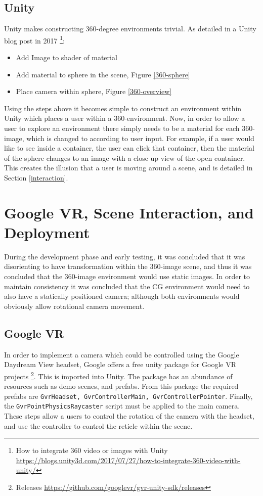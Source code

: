 \documentclass[ %
                    author={Elis Jones},
                supervisor={Dr. Kirsten Cater},
                    degree={BSc},
                     title={The Effect of Presentation Medium on Spatial Cognition},
                  subtitle={in the Virtual Environment},
                      year={2018} ]{dissertation}
\begin{document}
\subsection{Unity}
Unity makes constructing 360-degree environments trivial. As detailed in a Unity blog post in 2017 \footnote{How to integrate 360 video or images with Unity \url{https://blogs.unity3d.com/2017/07/27/how-to-integrate-360-video-with-unity/}}: 

\begin{itemize}
\item Add Image to shader of material
\item Add material to sphere in the scene, Figure \ref{360-sphere}
\item Place camera within sphere, Figure \ref{360-overview}
\end{itemize}

Using the steps above it becomes simple to construct an environment within Unity which places a user within a 360-environment. Now, in order to allow a user to explore an environment there simply needs to be a material for each 360-image, which is changed to according to user input. For example, if a user would like to see inside a container, the user can click that container, then the material of the sphere changes to an image with a close up view of the open container. This creates the illusion that a user is moving around a scene, and is detailed in Section \ref{interaction}. 

\section{Google VR, Scene Interaction, and Deployment}
During the development phase and early testing, it was concluded that it was disorienting to have transformation within the 360-image scene, and thus it was concluded that the 360-image environment would use static images. In order to maintain consistency it was concluded that the CG environment would need to also have a statically positioned camera; although both environments would obviously allow rotational camera movement.  

\subsection{Google VR}\label{googlevr}

In order to implement a camera which could be controlled using the Google Daydream View headset, Google offers a free unity package for Google VR projects \footnote{Releases \url{https://github.com/googlevr/gvr-unity-sdk/releases}}. This is imported into Unity. The package has an abundance of resources such as demo scenes, and prefabs. From this package the required prefabs are \lstinline{GvrHeadset, GvrControllerMain, GvrControllerPointer}. Finally, the \lstinline{GvrPointPhysicsRaycaster} script must be applied to the main camera. These steps allow a users to control the rotation of the camera with the headset, and use the controller to control the reticle within the scene. 
\end{document}
